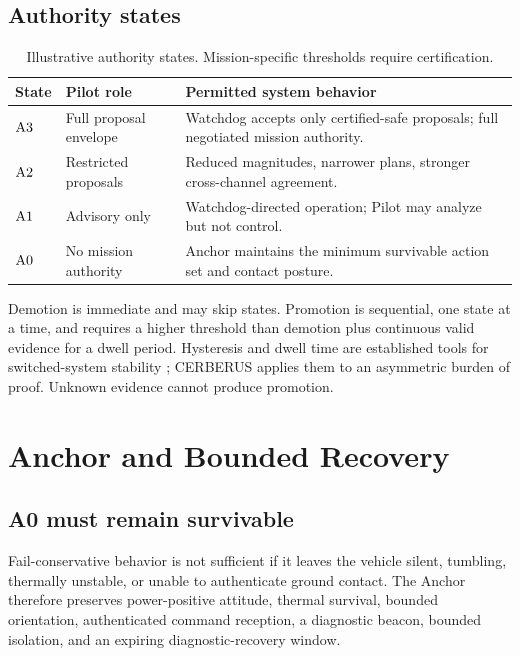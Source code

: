 \subsection{Authority states}
\begin{table}[t]
\centering
\caption{Illustrative authority states. Mission-specific thresholds require certification.}
\label{tab:authority}
\small
\begin{tabularx}{\textwidth}{@{}p{}p{}X@{}}
\toprule
State & Pilot role & Permitted system behavior \\
\midrule
$\mathrm{A3}$ & Full proposal envelope & Watchdog accepts only certified-safe proposals; full negotiated mission authority. \\
$\mathrm{A2}$ & Restricted proposals & Reduced magnitudes, narrower plans, stronger cross-channel agreement. \\
$\mathrm{A1}$ & Advisory only & Watchdog-directed operation; Pilot may analyze but not control. \\
$\mathrm{A0}$ & No mission authority & Anchor maintains the minimum survivable action set and contact posture. \\
\bottomrule
\end{tabularx}
\end{table}

Demotion is immediate and may skip states. Promotion is sequential, one state at a time, and requires a higher threshold than demotion plus continuous valid evidence for a dwell period. Hysteresis and dwell time are established tools for switched-system stability \cite{HespanhaMorse1999,Liberzon2003}; CERBERUS applies them to an asymmetric burden of proof. Unknown evidence cannot produce promotion.

\section{Anchor and Bounded Recovery}
\subsection{A0 must remain survivable}
Fail-conservative behavior is not sufficient if it leaves the vehicle silent, tumbling, thermally unstable, or unable to authenticate ground contact. The Anchor therefore preserves power-positive attitude, thermal survival, bounded orientation, authenticated command reception, a diagnostic beacon, bounded isolation, and an expiring diagnostic-recovery window.

